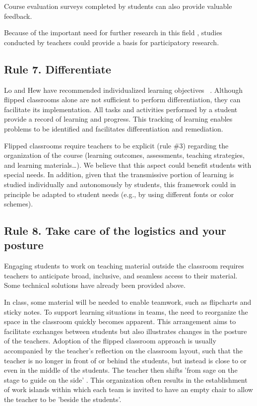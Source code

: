 \documentclass[10pt,letterpaper]{article}
\begin{document}
Course evaluation surveys completed by students can also provide valuable feedback.

Because of the important need for further research in this field \cite{abeysekera_motivation_2015,bishop_flipped_2013,lo_critical_2017}, studies conducted 
by teachers could provide a basis for participatory research.

\subsection{Rule 7. Differentiate}

Lo and Hew have recommended individualized learning objectives ~\cite{lo_critical_2017}. Although flipped classrooms alone are not sufficient
to perform differentiation, they can facilitate its implementation. All tasks and activities performed by a student provide a record
of learning and progress. This tracking of learning enables problems to be identified and facilitates differentiation and remediation.

Flipped classrooms require teachers to be explicit (rule \#3) regarding the organization of the course (learning outcomes, assessments, 
teaching strategies, and learning materials\ldots). We believe that this aspect could benefit students with special needs. 
In addition, given that the transmissive portion of learning is studied individually and autonomously by students, 
this framework could in principle be adapted to student needs (e.g., by using different fonts or color schemes).


\subsection{Rule 8. Take care of the logistics and your posture}

Engaging students to work on teaching material outside the classroom requires teachers to anticipate broad, inclusive, 
and seamless access to their material. Some technical solutions have already been provided above.

In class, some material will be needed to enable teamwork, such as flipcharts and sticky notes. 
To support learning situations in teams, the need to reorganize the space in the classroom
quickly becomes apparent. 
This arrangement aims to facilitate exchanges between students but also illustrates changes in the posture of the teachers. 
Adoption of the flipped classroom approach is usually accompanied by the teacher’s reflection on the classroom layout, such that 
the teacher is no longer in front of or behind the students, but instead is close to or even in the middle of the students. 
The teacher then shifts 'from sage on the stage to guide on the side' \cite{king_sage_1993}. 
This organization often results in the establishment of work islands within which each team is invited to have 
an empty chair to allow the teacher to be 'beside the students'.
\end{document}

